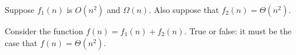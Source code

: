 \begin{prob}
    Suppose $f_1(n)$ is $O(n^2)$ and $\Omega(n)$. Also suppose that $f_2(n) = \Theta(n^2)$.

    Consider the function $f(n) = f_1(n) + f_2(n)$. True or false: it must be 
    the case that $f(n) = \Theta(n^2)$.

    \Tf{}
\end{prob}
